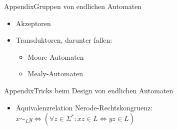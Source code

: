 \begin{frame}{Appendix}{Gruppen von endlichen Automaten}
  \begin{itemize}
    \item \alert{Akzeptoren}
    \item \alert{Transduktoren}, darunter fallen:
      \begin{itemize}
        \item \alert{Moore-Automaten}
        \item \alert{Mealy-Automaten}
      \end{itemize}
  \end{itemize}
\end{frame}

\begin{frame}{Appendix}{Tricks beim Design von endlichen Automaten}
  \begin{itemize}
    \item \alert{Äquivalenzrelation Nerode-Rechtskongruenz:} $x \sim_L y \Longleftrightarrow\left(\forall z \in \Sigma^*: x z \in L \Longleftrightarrow y z \in L\right)$
  \end{itemize}
\end{frame}

%
